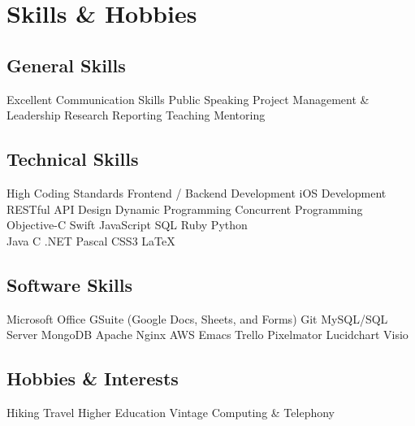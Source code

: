 \vspace{-2\bigskipamount}
\section{Skills \& Hobbies}
\small

\subsection{General Skills}
\chevron{} Excellent Communication Skills
\chevron{} Public Speaking
\chevron{} Project Management \& Leadership
\chevron{} Research
\chevron{} Reporting
\chevron{} Teaching
\chevron{} Mentoring
\medskip

\subsection{Technical Skills}
\chevron{} High Coding Standards
\chevron{} Frontend / Backend Development
\chevron{} iOS Development~
\chevron{} RESTful API Design
\chevron{} Dynamic Programming
\chevron{} Concurrent Programming
\chevron{} Objective-C
\chevron{} Swift
\chevron{} JavaScript
\chevron{} SQL
\chevron{} Ruby
\chevron{} Python
\chevron{} \Csh{}\\
\chevron{} Java
\chevron{} C
\chevron{} \Cpp{}
\chevron{} .NET
\chevron{} Pascal
\chevron{} CSS3
\chevron{} {\rmfamily\LaTeX}
\medskip

\subsection{Software Skills}
\chevron{} Microsoft Office
\chevron{} GSuite (Google Docs, Sheets, and Forms)
\chevron{} Git
\chevron{} MySQL/SQL Server
\chevron{} MongoDB
\chevron{} Apache
\chevron{} Nginx
\chevron{} AWS
\chevron{} Emacs
\chevron{} Trello
\chevron{} Pixelmator
\chevron{} Lucidchart
\chevron{} Visio
\medskip

\subsection{Hobbies \& Interests}
\chevron{} Hiking
\chevron{} Travel
\chevron{} Higher Education
\chevron{} Vintage Computing \& Telephony


